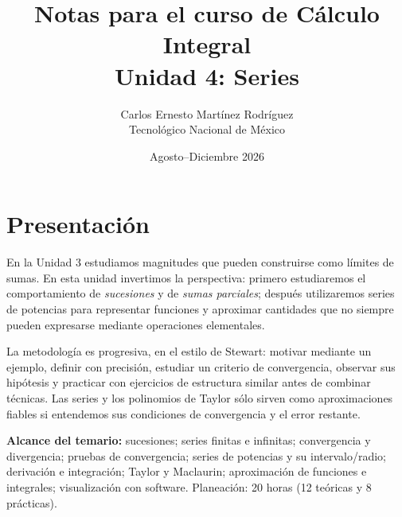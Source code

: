 \documentclass[12pt]{article}
\title{\textbf{Notas para el curso de Cálculo Integral}\\[0.3cm]\Large Unidad 4: Series}
\author{Carlos Ernesto Martínez Rodríguez\\Tecnológico Nacional de México}
\date{Agosto--Diciembre 2026}
\theoremstyle{definition}
\theoremstyle{remark}
\begin{document}
\maketitle
\tableofcontents
\newpage
\section*{Presentación}
En la Unidad 3 estudiamos magnitudes que pueden construirse como límites de sumas. En esta unidad invertimos la perspectiva: primero estudiaremos el comportamiento de \emph{sucesiones} y de \emph{sumas parciales}; después utilizaremos series de potencias para representar funciones y aproximar cantidades que no siempre pueden expresarse mediante operaciones elementales.

La metodología es progresiva, en el estilo de Stewart: motivar mediante un ejemplo, definir con precisión, estudiar un criterio de convergencia, observar sus hipótesis y practicar con ejercicios de estructura similar antes de combinar técnicas. Las series y los polinomios de Taylor sólo sirven como aproximaciones fiables si entendemos sus condiciones de convergencia y el error restante.

\textbf{Alcance del temario:} sucesiones; series finitas e infinitas; convergencia y divergencia; pruebas de convergencia; series de potencias y su intervalo/radio; derivación e integración; Taylor y Maclaurin; aproximación de funciones e integrales; visualización con software. Planeación: 20 horas (12 teóricas y 8 prácticas).

\end{document}
